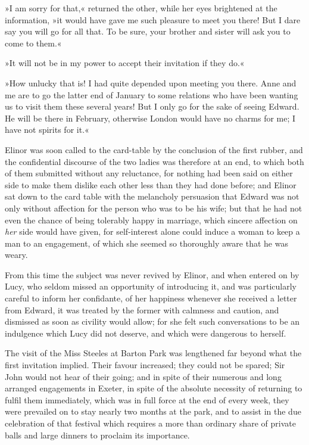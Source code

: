 »I am sorry for that,« returned the other, while her eyes brightened at the information, »it would have gave me such pleasure to meet you there! But I dare say you will go for all that. To be sure, your brother and sister will ask you to come to them.«

»It will not be in my power to accept their invitation if they do.«

»How unlucky that is! I had quite depended upon meeting you there. Anne and me are to go the latter end of January to some relations who have been wanting us to visit them these several years! But I only go for the sake of seeing Edward. He will be there in February, otherwise London would have no charms for me; I have not spirits for it.«

Elinor was soon called to the card-table by the conclusion of the first rubber, and the confidential discourse of the two ladies was therefore at an end, to which both of them submitted without any reluctance, for nothing had been said on either side to make them dislike each other less than they had done before; and Elinor sat down to the card table with the melancholy persuasion that Edward was not only without affection for the person who was to be his wife; but that he had not even the chance of being tolerably happy in marriage, which sincere affection on \textit{her} side would have given, for self-interest alone could induce a woman to keep a man to an engagement, of which she seemed so thoroughly aware that he was weary.

From this time the subject was never revived by Elinor, and when entered on by Lucy, who seldom missed an opportunity of introducing it, and was particularly careful to inform her confidante, of her happiness whenever she received a letter from Edward, it was treated by the former with calmness and caution, and dismissed as soon as civility would allow; for she felt such conversations to be an indulgence which Lucy did not deserve, and which were dangerous to herself.

The visit of the Miss Steeles at Barton Park was lengthened far beyond what the first invitation implied. Their favour increased; they could not be spared; Sir John would not hear of their going; and in spite of their numerous and long arranged engagements in Exeter, in spite of the absolute necessity of returning to fulfil them immediately, which was in full force at the end of every week, they were prevailed on to stay nearly two months at the park, and to assist in the due celebration of that festival which requires a more than ordinary share of private balls and large dinners to proclaim its importance.